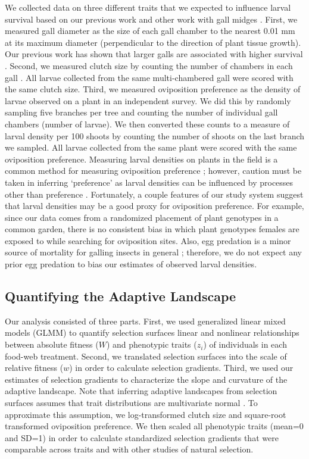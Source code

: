 \documentclass[11pt,]{article}
\begin{document}
We collected data on three different traits that we expected to
influence larval survival based on our previous work \citep{Barbour2016}
and other work with gall midges \citep{Weis1983, Heath2018}. First, we
measured gall diameter as the size of each gall chamber to the nearest
0.01 mm at its maximum diameter (perpendicular to the direction of plant
tissue growth). Our previous work has shown that larger galls are
associated with higher survival \citep{Barbour2016}. Second, we measured
clutch size by counting the number of chambers in each gall
\citep{Weis1983, Heath2018}. All larvae collected from the same
multi-chambered gall were scored with the same clutch size. Third, we
measured oviposition preference as the density of larvae observed on a
plant in an independent survey. We did this by randomly sampling five
branches per tree and counting the number of individual gall chambers
(number of larvae). We then converted these counts to a measure of
larval density per 100 shoots by counting the number of shoots on the
last branch we sampled. All larvae collected from the same plant were
scored with the same oviposition preference. Measuring larval densities
on plants in the field is a common method for measuring oviposition
preference \citep{Gripenberg2010}; however, caution must be taken in
inferring `preference' as larval densities can be influenced by
processes other than preference \citep{Singer1986}. Fortunately, a
couple features of our study system suggest that larval densities may be
a good proxy for oviposition preference. For example, since our data
comes from a randomized placement of plant genotypes in a common garden,
there is no consistent bias in which plant genotypes females are exposed
to while searching for oviposition sites. Also, egg predation is a minor
source of mortality for galling insects in general \citep{Hawkins1997};
therefore, we do not expect any prior egg predation to bias our
estimates of observed larval densities.

\subsection{Quantifying the Adaptive
Landscape}\label{quantifying-the-adaptive-landscape}

Our analysis consisted of three parts. First, we used generalized linear
mixed models (GLMM) to quantify selection surfaces \textemdash linear
and nonlinear relationships between absolute fitness (\(W\)) and
phenotypic traits (\(z_i\)) of individuals \textemdash in each food-web
treatment. Second, we translated selection surfaces into the scale of
relative fitness (\(w\)) in order to calculate selection gradients.
Third, we used our estimates of selection gradients to characterize the
slope and curvature of the adaptive landscape. Note that inferring
adaptive landscapes from selection surfaces assumes that trait
distributions are multivariate normal \citep{Lande1983}. To approximate
this assumption, we log-transformed clutch size and square-root
transformed oviposition preference. We then scaled all phenotypic traits
(mean=0 and SD=1) in order to calculate standardized selection gradients
that were comparable across traits and with other studies of natural
selection.
\end{document}
